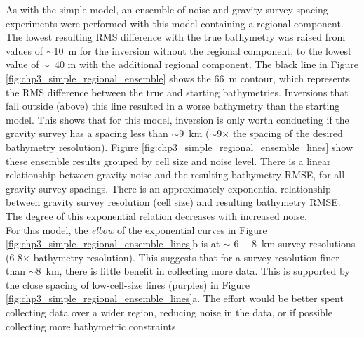 As with the simple model, an ensemble of noise and gravity survey spacing experiments were performed with this model containing a regional component. The lowest resulting RMS difference with the true bathymetry was raised from values of $\sim$10~m for the inversion without the regional component, to the lowest value of $\sim$~40 m with the additional regional component. The black line in Figure \ref{fig:chp3_simple_regional_ensemble} shows the 66~m contour, which represents the RMS difference between the true and starting bathymetries. Inversions that fall outside (above) this line resulted in a worse bathymetry than the starting model. This shows that for this model, inversion is only worth conducting if the gravity survey has a spacing less than $\sim$9~km ($\sim$9$\times$ the spacing of the desired bathymetry resolution). Figure \ref{fig:chp3_simple_regional_ensemble_lines} show these ensemble results grouped by cell size and noise level. There is a linear relationship between gravity noise and the resulting bathymetry RMSE, for all gravity survey spacings. There is an approximately exponential relationship between gravity survey resolution (cell size) and resulting bathymetry RMSE. The degree of this exponential relation decreases with increased noise. \\

For this model, the \textit{elbow} of the exponential curves in Figure \ref{fig:chp3_simple_regional_ensemble_lines}b is at $\sim$ 6~-~8~km survey resolutions (6-8$\times$ bathymetry resolution). This suggests that for a survey resolution finer than $\sim$8~km, there is little benefit in collecting more data. This is supported by the close spacing of low-cell-size lines (purples) in Figure \ref{fig:chp3_simple_regional_ensemble_lines}a. The effort would be better spent collecting data over a wider region, reducing noise in the data, or if possible collecting more bathymetric constraints.

